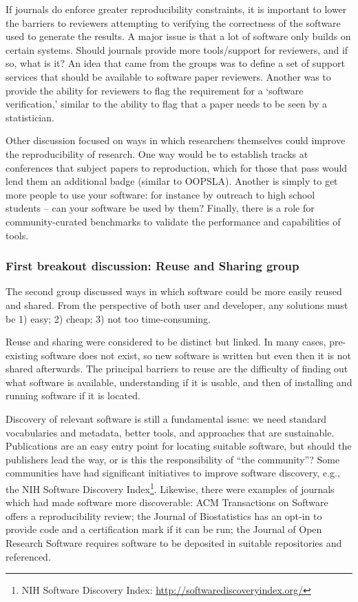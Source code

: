 \documentclass[11pt, oneside]{amsart}
\begin{document}
If journals do enforce greater reproducibility constraints, it is important to
lower the barriers to reviewers attempting to verifying the correctness of the
software used to generate the results. A major issue is that a lot of software
only builds on certain systems. Should journals provide more tools/support for
reviewers, and if so, what is it? An idea that came from the groups was to
define a set of support services that should be available to software paper
reviewers. Another was to provide the ability for reviewers to flag the
requirement for a `software verification,' similar to the ability to flag that a
paper needs to be seen by a statistician.

Other discussion focused on ways in which researchers themselves could improve
the reproducibility of research. One way would be to establish tracks at
conferences that subject papers to reproduction, which for those that pass would
lend them an additional badge (similar to OOPSLA). Another is simply to get more
people to use your software: for instance by outreach to high school students --
can your software be used by them? Finally, there is a role for
community-curated benchmarks to validate the performance and capabilities of
tools.

\subsubsection{First breakout discussion: Reuse and Sharing group}

The second group discussed ways in which software could be more easily reused
and shared. From the perspective of both user and developer, any solutions must
be 1) easy; 2) cheap; 3) not too time-consuming.

Reuse and sharing were considered to be distinct but linked. In many cases,
pre-existing software does not exist, so new software is written but even then
it is not shared afterwards. The principal barriers to reuse are the difficulty
of finding out what software is available, understanding if it is usable, and
then of installing and running software if it is located.

Discovery of relevant software is still a fundamental issue: we need standard
vocabularies and metadata, better tools, and approaches that are sustainable.
Publications are an easy entry point for locating suitable software, but should
the publishers lead the way, or is this the responsibility of ``the community''?
Some communities have had significant initiatives to improve software discovery,
e.g., the NIH Software Discovery Index\footnote{NIH Software Discovery Index:
\url{http://softwarediscoveryindex.org/}}. Likewise, there were examples of
journals which had made software more discoverable: ACM Transactions on Software
offers a reproducibility review; the Journal of Biostatistics has an opt-in to
provide code and a certification mark if it can be run; the Journal of Open
Research Software requires software to be deposited in suitable repositories and
referenced.
\end{document}
